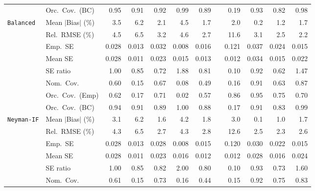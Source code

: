 \begin{landscape}
\begin{longtable}{llrrrrrrrrrr}
 & Orc.\ Cov.\ (BC) & \cellcolor{rankone}0.95 & 0.91 & 0.92 & 0.99 & 0.89 &  & 0.19 & \cellcolor{ranktwo}0.93 & 0.82 & \cellcolor{rankthree}0.98 \\
\addlinespace[2pt]
\quad \texttt{Balanced} & Mean $|$Bias$|$ (\%) & 3.5 & 6.2 & 2.1 & 4.5 & 1.7 &  & 2.0 & \cellcolor{rankone}0.2 & \cellcolor{ranktwo}1.2 & \cellcolor{rankthree}1.7 \\
 & Rel.\ RMSE (\%) & 4.5 & 6.5 & 3.2 & 4.6 & \cellcolor{rankthree}2.7 &  & 11.6 & 3.1 & \cellcolor{ranktwo}2.5 & \cellcolor{rankone}2.2 \\
 & Emp.\ SE & 0.028 & 0.013 & 0.032 & 0.008 & 0.016 &  & 0.121 & 0.037 & 0.024 & 0.015 \\
 & Mean SE & 0.028 & 0.011 & 0.023 & 0.015 & 0.013 &  & 0.012 & 0.034 & 0.015 & 0.022 \\
 & SE ratio & \cellcolor{rankone}1.00 & \cellcolor{rankthree}0.85 & 0.72 & 1.88 & 0.81 &  & 0.10 & \cellcolor{ranktwo}0.92 & 0.62 & 1.47 \\
 & Nom.\ Cov. & 0.60 & 0.15 & \cellcolor{rankthree}0.67 & 0.08 & 0.49 &  & 0.16 & \cellcolor{rankone}0.91 & 0.63 & \cellcolor{ranktwo}0.87 \\
 & Orc.\ Cov.\ (Emp) & 0.62 & 0.17 & 0.71 & 0.02 & 0.57 &  & \cellcolor{ranktwo}0.86 & \cellcolor{rankone}0.95 & \cellcolor{rankthree}0.75 & 0.70 \\
 & Orc.\ Cov.\ (BC) & \cellcolor{rankone}0.94 & \cellcolor{ranktwo}0.91 & 0.89 & 1.00 & 0.88 &  & 0.17 & 0.91 & 0.83 & \cellcolor{rankthree}0.99 \\
\addlinespace[2pt]
\quad \texttt{Neyman-IF} & Mean $|$Bias$|$ (\%) & 3.1 & 6.2 & \cellcolor{rankthree}1.6 & 4.2 & 1.8 &  & 3.0 & \cellcolor{rankone}0.1 & \cellcolor{ranktwo}1.0 & 1.7 \\
 & Rel.\ RMSE (\%) & 4.3 & 6.5 & 2.7 & 4.3 & 2.8 &  & 12.6 & \cellcolor{ranktwo}2.5 & \cellcolor{rankone}2.3 & \cellcolor{rankthree}2.6 \\
 & Emp.\ SE & 0.028 & 0.013 & 0.028 & 0.008 & 0.015 &  & 0.120 & 0.030 & 0.022 & 0.015 \\
 & Mean SE & 0.028 & 0.011 & 0.023 & 0.016 & 0.012 &  & 0.012 & 0.028 & 0.016 & 0.024 \\
 & SE ratio & \cellcolor{rankone}1.00 & \cellcolor{rankthree}0.85 & 0.82 & 2.00 & 0.80 &  & 0.10 & \cellcolor{ranktwo}0.93 & 0.73 & 1.60 \\
 & Nom.\ Cov. & 0.61 & 0.15 & 0.73 & 0.16 & 0.44 &  & 0.15 & \cellcolor{rankone}0.92 & \cellcolor{rankthree}0.75 & \cellcolor{ranktwo}0.83 \\

\end{longtable}
\end{landscape}

